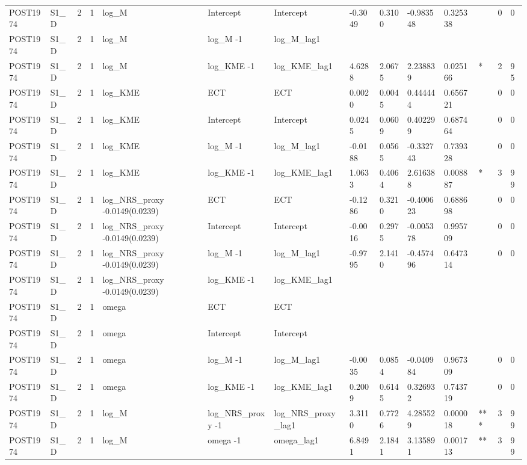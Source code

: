 \begin{tabular}{llllllllllllll}
POST1974 & S1\_D & 2 & 1 & log\_M & Intercept & Intercept & -0.3049 & 0.3100 & -0.983548 & 0.325338 &  & 0 & 0 \\
POST1974 & S1\_D & 2 & 1 & log\_M & log\_M -1 & log\_M\_lag1 &  &  &  &  &  &  &  \\
POST1974 & S1\_D & 2 & 1 & log\_M & log\_KME -1 & log\_KME\_lag1 & 4.6288 & 2.0675 & 2.238839 & 0.025166 & * & 2 & 95 \\
POST1974 & S1\_D & 2 & 1 & log\_KME & ECT & ECT & 0.0020 & 0.0045 & 0.444444 & 0.656721 &  & 0 & 0 \\
POST1974 & S1\_D & 2 & 1 & log\_KME & Intercept & Intercept & 0.0245 & 0.0609 & 0.402299 & 0.687464 &  & 0 & 0 \\
POST1974 & S1\_D & 2 & 1 & log\_KME & log\_M -1 & log\_M\_lag1 & -0.0188 & 0.0565 & -0.332743 & 0.739328 &  & 0 & 0 \\
POST1974 & S1\_D & 2 & 1 & log\_KME & log\_KME -1 & log\_KME\_lag1 & 1.0633 & 0.4064 & 2.616388 & 0.008887 & * & 3 & 99 \\
POST1974 & S1\_D & 2 & 1 & log\_NRS\_proxy -0.0149(0.0239) & ECT & ECT & -0.1286 & 0.3210 & -0.400623 & 0.688698 &  & 0 & 0 \\
POST1974 & S1\_D & 2 & 1 & log\_NRS\_proxy -0.0149(0.0239) & Intercept & Intercept & -0.0016 & 0.2975 & -0.005378 & 0.995709 &  & 0 & 0 \\
POST1974 & S1\_D & 2 & 1 & log\_NRS\_proxy -0.0149(0.0239) & log\_M -1 & log\_M\_lag1 & -0.9795 & 2.1410 & -0.457496 & 0.647314 &  & 0 & 0 \\
POST1974 & S1\_D & 2 & 1 & log\_NRS\_proxy -0.0149(0.0239) & log\_KME -1 & log\_KME\_lag1 &  &  &  &  &  &  &  \\
POST1974 & S1\_D & 2 & 1 & omega & ECT & ECT &  &  &  &  &  &  &  \\
POST1974 & S1\_D & 2 & 1 & omega & Intercept & Intercept &  &  &  &  &  &  &  \\
POST1974 & S1\_D & 2 & 1 & omega & log\_M -1 & log\_M\_lag1 & -0.0035 & 0.0854 & -0.040984 & 0.967309 &  & 0 & 0 \\
POST1974 & S1\_D & 2 & 1 & omega & log\_KME -1 & log\_KME\_lag1 & 0.2009 & 0.6145 & 0.326932 & 0.743719 &  & 0 & 0 \\
POST1974 & S1\_D & 2 & 1 & log\_M & log\_NRS\_proxy -1 & log\_NRS\_proxy\_lag1 & 3.3110 & 0.7726 & 4.285529 & 0.000018 & *** & 3 & 99 \\
POST1974 & S1\_D & 2 & 1 & log\_M & omega -1 & omega\_lag1 & 6.8491 & 2.1841 & 3.135891 & 0.001713 & ** & 3 & 99 \\

\end{tabular}
